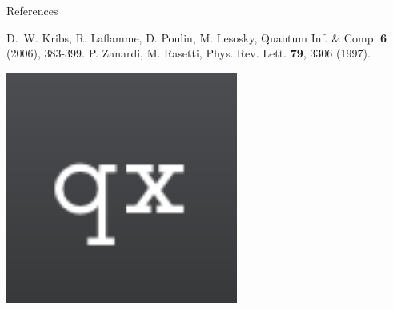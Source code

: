\documentclass[final]{beamer}
\newlength{\onecolwid}
\begin{document}
\begin{frame}[t]
\begin{columns}[t]
\begin{column}{\onecolwid}
\begin{block}{References}
        \small{\begin{thebibliography}{99}
         D.~W. Kribs, R. Laflamme, D. Poulin, M. Lesosky, Quantum Inf. \& Comp. \textbf{6} (2006), 383-399.
         P. Zanardi, M. Rasetti, Phys. Rev. Lett. \textbf{79},  3306 (1997).
        \end{thebibliography}}
        \vspace{0.75in}
        \begin{center}
          \includegraphics[width=3in]{qx.png}
        \end{center}
      \end{block}
    \end{column}

  \end{columns}
\end{frame}
\end{document}
